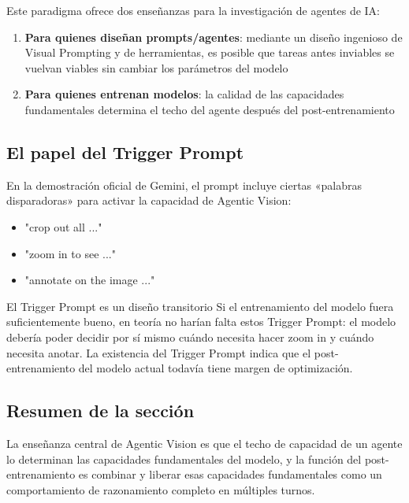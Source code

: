 \documentclass[a4paper]{article}
\begin{document}
Este paradigma ofrece dos enseñanzas para la investigación de agentes de IA:

\begin{enumerate}
    \item \textbf{Para quienes diseñan prompts/agentes}: mediante un diseño ingenioso de Visual Prompting y de herramientas, es posible que tareas antes inviables se vuelvan viables sin cambiar los parámetros del modelo
    \item \textbf{Para quienes entrenan modelos}: la calidad de las capacidades fundamentales determina el techo del agente después del post-entrenamiento
\end{enumerate}

\subsection{El papel del Trigger Prompt}

En la demostración oficial de Gemini, el prompt incluye ciertas «palabras disparadoras» para activar la capacidad de Agentic Vision:

\begin{itemize}
    \item "crop out all ..."
    \item "zoom in to see ..."
    \item "annotate on the image ..."
\end{itemize}

\begin{knowledgebox}{El Trigger Prompt es un diseño transitorio}
Si el entrenamiento del modelo fuera suficientemente bueno, en teoría no harían falta estos Trigger Prompt: el modelo debería poder decidir por sí mismo cuándo necesita hacer zoom in y cuándo necesita anotar. La existencia del Trigger Prompt indica que el post-entrenamiento del modelo actual todavía tiene margen de optimización.
\end{knowledgebox}

\subsection{Resumen de la sección}

La enseñanza central de Agentic Vision es que el techo de capacidad de un agente lo determinan las capacidades fundamentales del modelo, y la función del post-entrenamiento es combinar y liberar esas capacidades fundamentales como un comportamiento de razonamiento completo en múltiples turnos.
\end{document}
